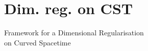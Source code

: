 \documentclass[9pt]{beamer}
\begin{document}
\section{Dim. reg. on CST}


{
 \begin{frame}
\bf
 \begin{exampleblock}{\vspace*{-3ex}}
 \begin{center}
 \Large Framework for a Dimensional Regularisation \\[10pt] on Curved Spacetime
 \end{center}
 \end{exampleblock}

\end{frame}
}

  
\end{document}
